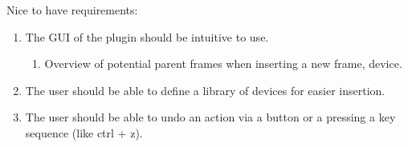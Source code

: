 Nice to have requirements:
\begin{enumerate}
	\item The GUI of the plugin should be intuitive to use.
	\begin{enumerate}
		\item Overview of potential parent frames when inserting a new frame, device.
	\end{enumerate}
	\item The user should be able to define a library of devices for easier insertion.
	\item The user should be able to undo an action via a button or a pressing a key sequence (like ctrl + z).
\end{enumerate}
